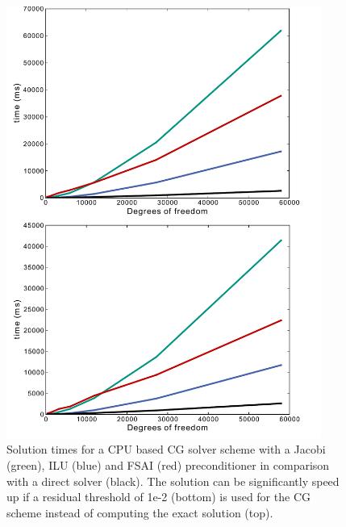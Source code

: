 \begin{figure}[htbp]
   \centering   
   \includegraphics[width=0.92\textwidth]{Figures/PreconditionerComparison.pdf}     
\caption{Solution times for a CPU based CG solver scheme with a Jacobi (green), ILU (blue) and FSAI (red) preconditioner in comparison with a direct solver (black). The solution can be significantly speed up if a residual threshold of 1e-2 (bottom) is used for the CG scheme instead of computing the exact solution (top).}
\label{PreconditionerComparison}
\end{figure}



